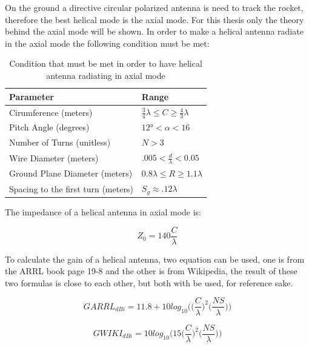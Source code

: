 On the ground a directive circular polarized antenna is need to track the rocket, therefore the best helical mode is the axial mode. For this thesis only the theory behind the axial mode will be shown. In order to make a helical antenna radiate in the axial mode the following condition must be met:

\begin{table}[h!]
\centering
\begin{tabular}{|l|l|}
\hline
Parameter                          & Range                                                   \\ \hline
Cirumference (meters)              & $\frac{3}{4}\lambda \leq C \geq \frac{4}{3}\lambda$     \\ \hline
Pitch Angle (degrees)              & $\ang{12} < \alpha < 16 $                               \\ \hline
Number of Turns (unitless)         & $N > 3$                                                 \\ \hline
Wire Diameter (meters)             & $.005 < \frac{d}{\lambda} < 0.05$                        \\ \hline
Ground Plane Diameter (meters)     & $0.8\lambda \leq R \geq 1.1\lambda$                     \\ \hline
Spacing to the first turn (meters) & $S_g \approx .12\lambda$                                \\ \hline
\end{tabular}
\caption{Condition that must be met in order to have helical antenna radiating in axial mode}
\end{table}

The impedance of a helical antenna in axial mode is: 

\begin{equation}
   Z_0 = 140\frac{C}{\lambda}
\end{equation}

To calculate the gain of a helical antenna, two equation can be used, one is from the ARRL book\cite{ARRL} page 19-8 and the other is from Wikipedia\cite{HelicalAntennaWiki}, the result of these two formulas is close to each other, but both with be used, for reference sake.  

\begin{equation}
   GARRL_{dBi} = 11.8+10log_{10}\Big(\Big(\frac{C}{\lambda}\Big)^2\Big(\frac{NS}{\lambda}\Big)\Big)
\end{equation}

\begin{equation}
   GWIKI_{dBi} = 10log_{10}\Big(15\Big(\frac{C}{\lambda}\Big)^2\Big(\frac{NS}{\lambda}\Big)\Big)
\end{equation}

